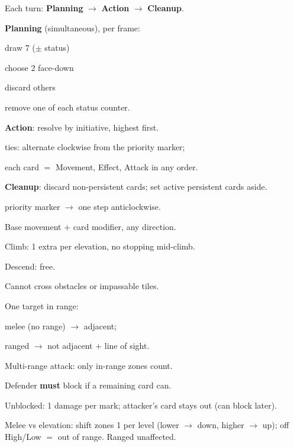 \documentclass[a4paper, twocolumn]{article}
\begin{document}
Each turn: \textbf{Planning} $\to$ \textbf{Action} $\to$ \textbf{Cleanup}.
\begin{qreflist}
\item \textbf{Planning} (simultaneous), per frame:
\begin{qreflist}
  \item  draw 7 ($\pm$ status)
  \item choose 2 face-down
  \item discard others
  \item remove one of each status counter.
\end{qreflist}
\item \textbf{Action}: resolve by initiative, highest first.
  \begin{qreflist}
  \item ties: alternate clockwise from the priority marker;
  \item each card $=$ Movement, Effect, Attack in any order.
  \end{qreflist}
\item \textbf{Cleanup}: discard non-persistent cards; set active persistent cards aside.
  \begin{qreflist}\item priority marker $\to$ one step anticlockwise.\end{qreflist}
\end{qreflist}

\begin{qreflist}
\item Base movement $+$ card modifier, any direction.
\item Climb: 1 extra per elevation, no stopping mid-climb.
\item Descend: free.
\item Cannot cross obstacles or impassable tiles.
\end{qreflist}

\begin{qreflist}
\item One target in range:
  \begin{qreflist}
  \item melee (no range) $\to$ adjacent;
  \item ranged $\to$ not adjacent $+$ line of sight.
  \end{qreflist}
\item Multi-range attack: only in-range zones count.
\item Defender \textbf{must} block if a remaining card can.
\item Unblocked: 1 damage per mark; attacker's card stays out (can block later).
\item Melee vs elevation: shift zones 1 per level (lower $\to$ down, higher $\to$ up); off High/Low $=$ out of range. Ranged unaffected.
\end{qreflist}
\end{document}
